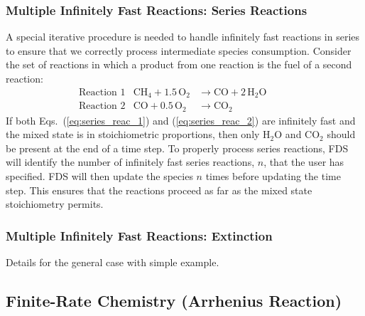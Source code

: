 \subsubsection{Multiple Infinitely Fast Reactions: Series Reactions}

A special iterative procedure is needed to handle infinitely fast reactions in series to ensure that we correctly process intermediate species consumption. Consider the set of reactions in which a product from one reaction is the fuel of a second reaction:
\begin{align}
&\mbox{Reaction 1}& \mathrm{CH_4 + 1.5 \, O_2} &\rightarrow  \mathrm{CO + 2 \, H_2O}       && && \label{eq:series_reac_1} \\
&\mbox{Reaction 2}& \mathrm{CO + 0.5 \, O_2} &\rightarrow \mathrm{CO_2}                    && && \label{eq:series_reac_2}
\end{align}
If both Eqs.~(\ref{eq:series_reac_1}) and (\ref{eq:series_reac_2}) are infinitely fast and the mixed state is in stoichiometric proportions, then only H$_2$O and CO$_2$ should be present at the end of a time step. To properly process series reactions, FDS will identify the number of infinitely fast series reactions, $n$, that the user has specified. FDS will then update the species $n$ times before updating the time step. This ensures that the reactions proceed as far as the mixed state stoichiometry permits.

\subsubsection{Multiple Infinitely Fast Reactions: Extinction}

Details for the general case with simple example.

\subsection{Finite-Rate Chemistry (Arrhenius Reaction)}
\label{Reaction_Rate_Model}

